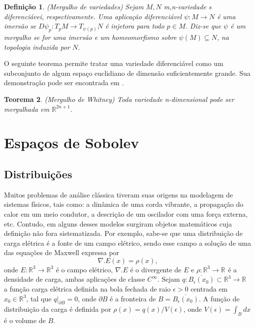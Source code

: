 \documentclass[12pt]{book}
\newtheorem{teorema}{Teorema}[section]
\newtheorem{definicao}[teorema]{Definição}
\newcommand{\real}[1]{\mathbb{R}^{#1}}
\newcommand{\reta}{\real{}}
\begin{document}
	\begin{definicao}\label{definicao_mergulho_variedades}
			(Mergulho de variedades) Sejam $M, N$ m,n-variedade s diferenciávei, respectivamente. Uma aplicação diferenciável $\psi:M\to N$ é uma imersão se $D\psi_{p}:T_{p}M\to T_{\psi(p)}N$ é injetora para todo $p \in M$. Diz-se que $\psi$ é um mergulho se for uma imersão e um homeomorfismo sobre $\psi(M) \subseteq N$, na topologia induzida por $N$. 
	\end{definicao}
	
	O seguinte teorema permite tratar uma variedade diferenciável como um subconjunto de algum espaço euclidiano de dimensão suficientemente grande. Sua demonstração pode ser encontrada em \cite{guillemin_differential_topology}.
	
	\begin{teorema}\label{teorema_whitney}
			(Mergulho de Whitney) Toda variedade n-dimensional pode ser mergulhada em $\real{2n+1}$.
	\end{teorema}
	
	
	\chapter{Espaços de Sobolev}
	\section{Distribuições}\label{secao_distribuicoes}
	Muitos problemas de análise clássica tiveram suas origens na modelagem de sistemas físicos, tais como: a dinâmica de uma corda vibrante, a propagação do calor em um meio condutor, a descrição de um oscilador com uma força externa, etc. Contudo, em alguns desses modelos surgiram objetos matemáticos cuja definição não fora sistematizada. Por exemplo, sabe-se que uma distribuição de carga elétrica é a fonte de um campo elétrico, sendo esse campo a solução de uma das equações de Maxwell expressa por
	$$
	\nabla.E(x) = \rho(x),
	$$
	onde $E:\real{3} \to \real{3} $ é o campo elétrico, $\nabla.E$ é o divergente de $E$ e $\rho:\real{3}\to \reta$ é a densidade de carga, ambas aplicações de classe $C^{\infty}$. Sejam $q:\overline{B_{\epsilon}(x_{0})} \subset \real{3}\to \reta$ a função carga elétrica definida na bola fechada de raio $\epsilon>0$ centrada em $x_{0}\in \real{3}$, tal que $q|_{\partial B} = 0$, onde $\partial B$ é a fronteira de $B=\overline{B_{\epsilon}(x_{0})}$. A função de distribuição da carga é definida por $\rho(x)=q(x)/V(\epsilon)$, onde $V(\epsilon)=\int_{B}dx$ é o volume de $B$.
	
\end{document}
